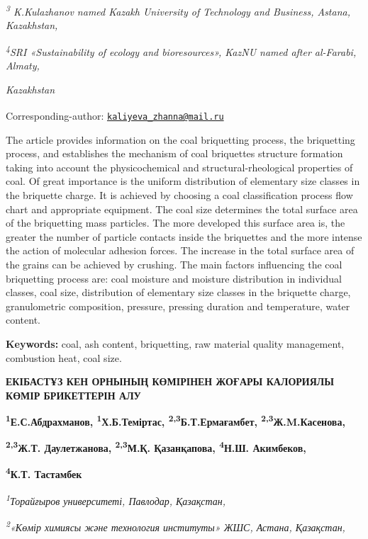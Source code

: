 \emph{\textsuperscript{3} K.Kulazhanov named Kazakh University of
Technology and Business, Astana, Kazakhstan,}

\emph{\textsuperscript{4}SRI «Sustainability of ecology and
bioresources», KazNU named after al-Farabi, Almaty,}

\emph{Kazakhstan}

{\bfseries \textsuperscript{\envelope }}Corresponding-author:
\href{mailto:kaliyeva_zhanna@mail.ru}{\nolinkurl{kaliyeva\_zhanna@mail.ru}}

The article provides information on the coal briquetting process, the
briquetting process, and establishes the mechanism of coal briquettes
structure formation taking into account the physicochemical and
structural-rheological properties of coal. Of great importance is the
uniform distribution of elementary size classes in the briquette charge.
It is achieved by choosing a coal classification process flow chart and
appropriate equipment. The coal size determines the total surface area
of the briquetting mass particles. The more developed this surface area
is, the greater the number of particle contacts inside the briquettes
and the more intense the action of molecular adhesion forces. The
increase in the total surface area of the grains can be achieved by
crushing. The main factors influencing the coal briquetting process are:
coal moisture and moisture distribution in individual classes, coal
size, distribution of elementary size classes in the briquette charge,
granulometric composition, pressure, pressing duration and temperature,
water content.

{\bfseries Keywords:} coal, ash content, briquetting, raw material quality
management, combustion heat, coal size.

{\bfseries ЕКІБАСТҰЗ КЕН ОРНЫНЫҢ КӨМІРІНЕН ЖОҒАРЫ КАЛОРИЯЛЫ КӨМІР
БРИКЕТТЕРІН АЛУ}

{\bfseries \textsuperscript{1}Е.С.Абдрахманов,
\textsuperscript{1}Х.Б.Теміртас, \textsuperscript{2,3}Б.Т.Ермағамбет,
\textsuperscript{2,3}Ж.M.Касенова,}

{\bfseries \textsuperscript{2,3}Ж.Т. Даулетжанова\textsuperscript{\envelope },
\textsuperscript{2,3}М.Қ. Қазанқапова, \textsuperscript{4}Н.Ш.
Акимбеков,}

{\bfseries \textsuperscript{4}К.Т. Тастамбек}

\emph{\textsuperscript{1}Торайғыров университеті, Павлодар, Қазақстан,}

\emph{\textsuperscript{2}«Көмір химиясы және технология институты» ЖШС,
Астана, Қазақстан,}

